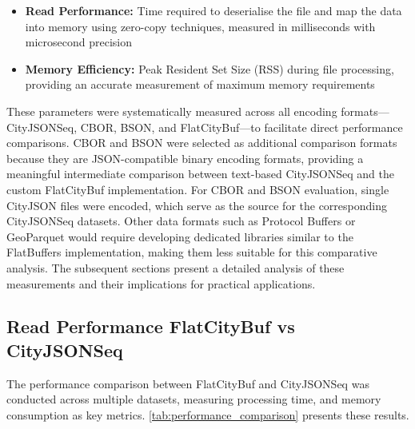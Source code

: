 \begin{itemize}
  \item \textbf{Read Performance:} Time required to deserialise the file and map the data into memory using zero-copy techniques, measured in milliseconds with microsecond precision

  \item \textbf{Memory Efficiency:} Peak Resident Set Size (RSS) during file processing, providing an accurate measurement of maximum memory requirements

\end{itemize}
These parameters were systematically measured across all encoding formats—CityJSONSeq, CBOR, BSON, and FlatCityBuf—to facilitate direct performance comparisons. CBOR and BSON were selected as additional comparison formats because they are JSON-compatible binary encoding formats, providing a meaningful intermediate comparison between text-based CityJSONSeq and the custom FlatCityBuf implementation. For CBOR and BSON evaluation, single CityJSON files were encoded, which serve as the source for the corresponding CityJSONSeq datasets. Other data formats such as Protocol Buffers or GeoParquet would require developing dedicated libraries similar to the FlatBuffers implementation, making them less suitable for this comparative analysis. The subsequent sections present a detailed analysis of these measurements and their implications for practical applications.

\subsection{Read Performance FlatCityBuf vs CityJSONSeq}
\label{result:benchmark_on_local_environment:read_performance_flatcitybuf_vs_cityjsonseq}

The performance comparison between FlatCityBuf and CityJSONSeq was conducted across multiple datasets, measuring processing time, and memory consumption as key metrics. \autoref{tab:performance_comparison} presents these results.

